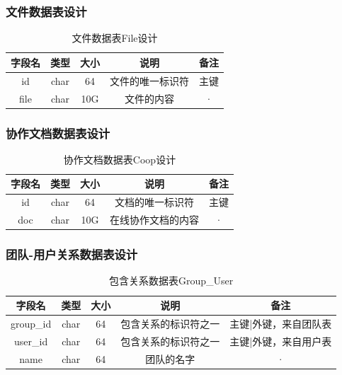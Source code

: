 \subsubsection{文件数据表设计}
\begin{table}[htbp]
\centering
\caption{文件数据表File设计} \label{tab:order-database}
\begin{tabular}{|c|c|c|c|c|}
    \hline
    字段名 & 类型 & 大小 & 说明 & 备注 \\
    \hline
    id & char & 64 & 文件的唯一标识符 & 主键\\
    \hline
    file & char & 10G & 文件的内容 & · \\
    \hline
\end{tabular}
\end{table}
\newpage
\subsubsection{协作文档数据表设计}
\begin{table}[htbp]
\centering
\caption{协作文档数据表Coop设计} \label{tab:order-database}
\begin{tabular}{|c|c|c|c|c|}
    \hline
    字段名 & 类型 & 大小 & 说明 & 备注 \\
    \hline
    id & char & 64 & 文档的唯一标识符 & 主键\\
    \hline
    doc & char & 10G & 在线协作文档的内容 & · \\
    \hline
\end{tabular}
\end{table}
\subsubsection{团队-用户关系数据表设计}
\begin{table}[htbp]
\centering
\caption{包含关系数据表Group\_User} \label{tab:order-database}
\begin{tabular}{|c|c|c|c|c|}
    \hline
    字段名 & 类型 & 大小 & 说明 & 备注 \\
    \hline
    group\_id & char & 64 & 包含关系的标识符之一 & 主键|外键，来自团队表
    \\
    \hline
    user\_id & char & 64 & 包含关系的标识符之一 & 主键|外键，来自用户表 \\
    \hline
    name & char & 64 & 团队的名字 & · \\
    \hline
\end{tabular}
\end{table}
